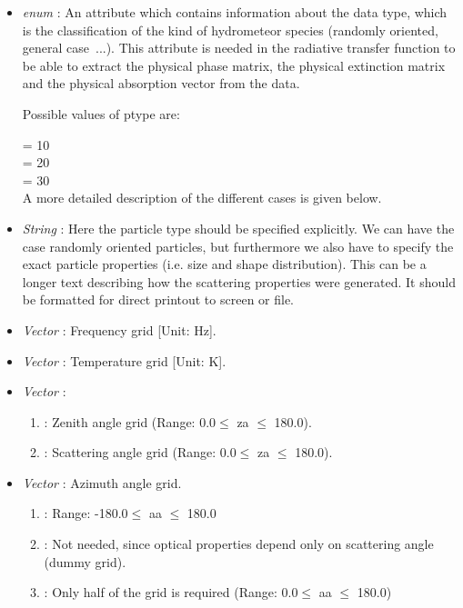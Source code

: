 \begin{itemize}
\item  {\sl enum} : An attribute which contains
  information about the 
  data type, which is the classification of the kind of hydrometeor
  species (randomly oriented, general case~...). This attribute is
  needed in the radiative transfer function to be able to extract
  the physical phase matrix, the physical extinction matrix and the
  physical absorption vector from the data. 
  
  Possible values of ptype are:
  
   = 10 \\
   = 20\\
   = 30\\
  
  A more detailed description of the different cases is given below.

\item {\sl String} : Here the particle type
  should be specified 
  explicitly. We can have the case randomly oriented particles, but
  furthermore we also have to specify the exact particle properties
  (i.e. size and shape distribution). This can be a longer text
  describing how the scattering properties were generated. It should
  be formatted for direct printout to screen or file.
  
\item {\sl Vector} : Frequency grid [Unit: Hz].
  
\item {\sl Vector} : Temperature grid [Unit: K].
  
\item {\sl Vector} :
  \begin{enumerate}
  \item {}: Zenith angle grid (Range: 0.0\degree $\le$ za $\le$ 180.0\degree).
  \item {}: Scattering angle grid (Range: 0.0\degree $\le$ za $\le$ 180.0\degree).
  \end{enumerate}
  
\item {\sl Vector} : Azimuth angle grid.
  \begin{enumerate}
  \item {}: Range: -180.0\degree $\le$ aa $\le$ 180.0\degree
  \item {}: Not needed, since optical properties depend only on
    scattering angle (dummy grid).
  \item {}: Only half of the grid is required (Range: 0.0\degree $\le$ aa $\le$ 180.0\degree)
  \end{enumerate}
  

\end{itemize}

